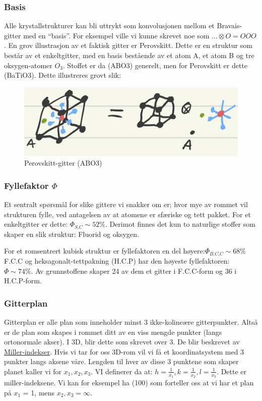 \documentclass{article}
\begin{document}
\subsubsection{Basis}
Alle krystallstrukturer kan bli uttrykt som konvolusjonen mellom et Bravais-gitter med en \enquote{basis}. For eksempel ville vi kunne skrevet noe som $\dots \otimes O = O O O$. En grov illustrasjon av et faktisk gitter er Perovskitt. Dette er en struktur som består av et enkeltgitter, med en basis bestående av et atom A, et atom B og tre oksygen-atomer $O_3$. Stoffet er da (ABO3) generelt, men for Perovskitt er dette (BaTiO3). Dette illustreres grovt slik:
\begin{figure}[H]
    \centering
    \includegraphics[width=0.5\linewidth]{bilder/perovskitt_gitter.png}
    \caption{Perovskitt-gitter (ABO3)}
    \label{fig:perovskitt_gitter}
\end{figure}
\subsubsection{Fyllefaktor $\Phi$}
Et sentralt spørsmål for slike gittere vi snakker om er; hvor mye av rommet vil strukturen fylle, ved antagelsen av at atomene er sfæriske og tett pakket. For et enkeltgitter er dette: $\Phi_{S.C} \sim 52\%$. Derimot finnes det kun to naturlige stoffer som skaper en slik struktur: Fluorid og oksygen.

For et romsentrert kubisk struktur er fyllefaktoren en del høyere:$\Phi_{B.C.C} \sim 68\%$
F.C.C og heksagonalt-tettpakning (H.C.P) har den høyeste fyllefaktoren: $\Phi \sim 74\%$. Av grunnstoffene skaper 24 av dem et gitter i F.C.C-form og 36 i H.C.P-form.
\subsubsection{Gitterplan}
Gitterplan er alle plan som inneholder minst 3 ikke-kolineære gitterpunkter. Altså er de plan som skapes i rommet ditt av en viss mengde punkter (langs ortonormale akser). I 3D, blir dette som skrevet over 3. De blir beskrevet av \underline{Miller-indekser}.
Hvis vi tar for oss 3D-rom vil vi få et koordinatsystem med 3 punkter langs aksene våre. Lengden til hver av disse 3 punktene som skaper planet kaller vi for $x_1, x_2, x_3$. VI definerer da at: $h = \frac{1}{x_1}, k = \frac{1}{x_2},l = \frac{1}{x_3}$. Dette er miller-indeksene. Vi kan for eksempel ha (100) som forteller oss at vi har et plan på $x_1$ = 1, mens $x_2, x_3 = \infty$.
\end{document}
